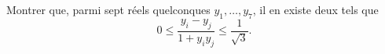 Montrer que, parmi sept réels quelconques $y_1, \ldots, y_7$, il en existe deux tels que
\[ 0 \leq \frac{y_i - y_j}{1 + y_iy_j} \leq \frac{1}{\sqrt{3}}. \]
